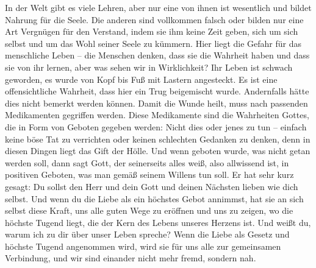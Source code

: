 In der Welt gibt es viele Lehren, aber nur eine von ihnen ist wesentlich und bildet Nahrung für die Seele. Die anderen sind vollkommen falsch oder bilden nur eine Art Vergnügen für den Verstand, indem sie ihm keine Zeit geben, sich um sich selbst und um das Wohl seiner Seele zu kümmern. Hier liegt die Gefahr für das menschliche Leben -- die Menschen denken, dass sie die Wahrheit haben und dass sie von ihr lernen, aber was sehen wir in Wirklichkeit? Ihr Leben ist schwach geworden, es wurde von Kopf bis Fuß mit Lastern angesteckt. Es ist eine offensichtliche Wahrheit, dass hier ein Trug beigemischt wurde. Andernfalls hätte dies nicht bemerkt werden können. Damit die Wunde heilt, muss nach passenden Medikamenten gegriffen werden. Diese Medikamente sind die Wahrheiten Gottes, die in Form von Geboten gegeben werden: Nicht dies oder jenes zu tun -- einfach keine böse Tat zu verrichten oder keinen schlechten Gedanken zu denken, denn in diesen Dingen liegt das Gift der Hölle. Und wenn geboten wurde, was nicht getan werden soll, dann sagt Gott, der seinerseits alles weiß, also allwissend ist, in positiven Geboten, was man gemäß seinem Willens tun soll. Er hat sehr kurz gesagt: Du sollst den Herr und dein Gott und deinen Nächsten lieben wie dich selbst. Und wenn du die Liebe als ein höchstes Gebot annimmst, hat sie an sich selbst diese Kraft, uns alle guten Wege zu eröffnen und uns zu zeigen, wo die höchste Tugend liegt, die der Kern des Lebens unseres Herzens ist. Und weißt du, warum ich zu dir über unser Leben spreche? Wenn die Liebe als Gesetz und höchste Tugend angenommen wird, wird sie für uns alle zur gemeinsamen Verbindung, und wir sind einander nicht mehr fremd, sondern nah.

